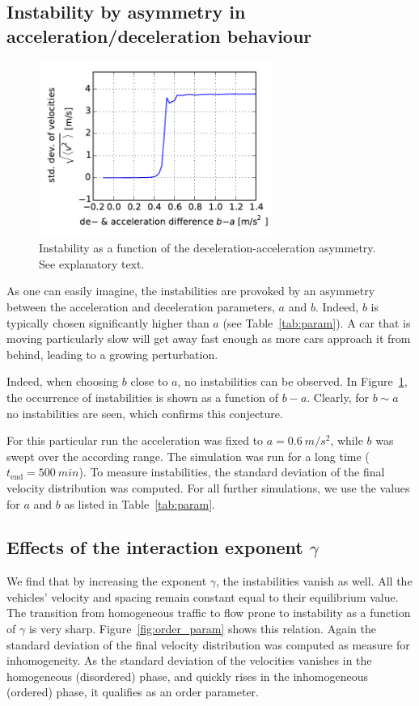 \subsection{Instability by asymmetry in acceleration/deceleration behaviour}
\label{sec:asymm}

\begin{figure}
    \centering
    \includegraphics[width=3in]{../img/order_parameter_delta_acceleration.pdf}
    \caption{Instability as a function of the deceleration-acceleration asymmetry. See explanatory text.}
    \label{fig:order_parameter_delta_acceleration}
\end{figure}
As one can easily imagine, the instabilities are provoked by an asymmetry between the acceleration and deceleration parameters, $a$ and $b$. Indeed, $b$ is typically chosen significantly higher than $a$ (see Table~\ref{tab:param}). A car that is moving particularly slow will get away fast enough as more cars approach it from behind, leading to a growing perturbation.

Indeed, when choosing $b$ close to $a$, no instabilities can be observed. In Figure~\ref{fig:order_parameter_delta_acceleration}, the occurrence of instabilities is shown as a function of $b-a$. Clearly, for $b\sim a$ no instabilities are seen, which confirms this conjecture.

 For this particular run the acceleration was fixed to $a=\SI{0.6}{m/s^2}$, while $b$ was swept over the according range. The simulation was run for a long time ($t_\mathrm{end} = \SI{500}{min}$). To measure instabilities, the standard deviation of the final velocity distribution was computed. For all further simulations, we use the values for $a$ and $b$ as listed in Table~\ref{tab:param}.

\subsection{Effects of the interaction exponent $\gamma$}
We find that by increasing the exponent $\gamma$, the instabilities vanish as well. All the vehicles' velocity and spacing remain constant equal to their equilibrium value. The transition from homogeneous traffic to flow prone to instability as a function of $\gamma$ is very sharp. Figure~\ref{fig:order_param} shows this relation. Again the standard deviation of the final velocity distribution was computed as measure for inhomogeneity. As the standard deviation of the velocities vanishes in the homogeneous (disordered) phase, and quickly rises in the inhomogeneous (ordered) phase, it qualifies as an order parameter.

